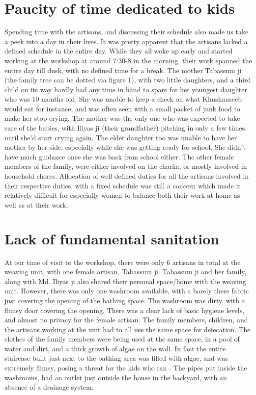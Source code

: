 \documentclass[journal]{IEEEtran}
\begin{document}
\section{Paucity of time dedicated to kids}
Spending time with the artisans, and discussing their schedule also made us take a peek into a day in their lives. It was pretty apparent that the artisans lacked a defined schedule in the entire day. While they all woke up early and started working at the workshop at around 7:30-8 in the morning, their work spanned the entire day till dusk, with no defined time for a break. The mother Tabassum ji (the family tree can be dotted via figure 1), with two little daughters, and a third child on its way hardly had any time in hand to spare for her youngest daughter who was 10 months old. She was unable to keep a check on what Khushnaseeb would eat for instance, and was often seen with a small packet of junk food to make her stop crying. The mother was the only one who was expected to take care of the babies, with Iliyas ji (their grandfather) pitching in only a few times, until she’d start crying again. The elder daughter too was unable to have her mother by her side, especially while she was getting ready for school. She didn’t have much guidance once she was back from school either. The other female members of the family, were either involved on the charka, or mostly involved in household chores. Allocation of well defined duties for all the artisans involved in their respective duties, with a fixed schedule was still a concern which made it relatively difficult for especially women to balance both their work at home as well as at their work. 



\section{ Lack of fundamental sanitation}
At our time of visit to the workshop, there were only 6 artisans in total at the weaving unit, with one female artisan, Tabassum ji. Tabassum ji and her family, along with Md. Iliyas ji also shared their personal space/home with the weaving unit. However, there was only one washroom available, with a barely there fabric just covering the opening of the bathing space. The washroom was dirty, with a flimsy door covering the opening. There was a clear lack of basic hygiene levels, and almost no privacy for the female artisan. The family members, children, and the artisans working at the unit had to all use the same space for defecation. The clothes of the family members were being used at the same space, in a pool of water and dirt, and a thick growth of algae on the wall. In fact the entire staircase built just next to the bathing area was filled with algae, and was extremely flimsy, posing a threat for the kids who ran . The pipes put inside the washrooms, had an outlet just outside the house in the backyard, with an absence of a drainage system. 
\end{document}
